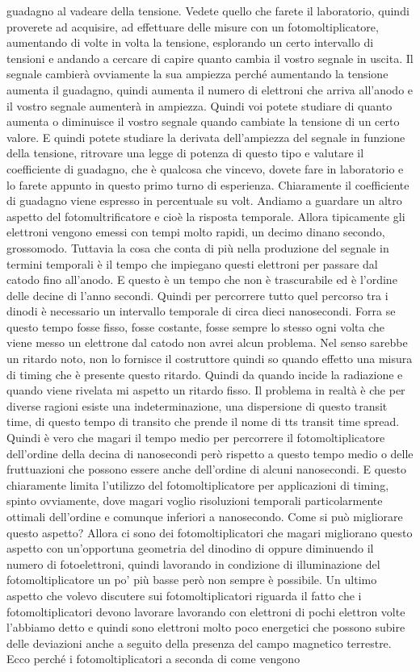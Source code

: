{guadagno al vadeare della tensione. Vedete quello che farete il laboratorio, quindi proverete ad acquisire, ad effettuare delle misure con un fotomoltiplicatore, aumentando di volte in volta la tensione, esplorando un certo intervallo di tensioni e andando a cercare di capire quanto cambia il vostro segnale in uscita. Il segnale cambierà ovviamente la sua ampiezza perché aumentando la tensione aumenta il guadagno, quindi aumenta il numero di elettroni che arriva all'anodo e il vostro segnale aumenterà in ampiezza. Quindi voi potete studiare di quanto aumenta o diminuisce il vostro segnale quando cambiate la tensione di un certo valore. E quindi potete studiare la derivata dell'ampiezza del segnale in funzione della tensione, ritrovare una legge di potenza di questo tipo e valutare il coefficiente di guadagno, che è qualcosa che vincevo, dovete fare in laboratorio e lo farete appunto in questo primo turno di esperienza. Chiaramente il coefficiente di guadagno viene espresso in percentuale su volt. Andiamo a guardare un altro aspetto del fotomultrificatore e cioè la risposta temporale. Allora tipicamente gli elettroni vengono emessi con tempi molto rapidi, un decimo dinano secondo, grossomodo. Tuttavia la cosa che conta di più nella produzione del segnale in termini temporali è il tempo che impiegano questi elettroni per passare dal catodo fino all'anodo. E questo è un tempo che non è trascurabile ed è l'ordine delle decine di l'anno secondi. Quindi per percorrere tutto quel percorso tra i dinodi è necessario un intervallo temporale di circa dieci nanosecondi. Forra se questo tempo fosse fisso, fosse costante, fosse sempre lo stesso ogni volta che viene messo un elettrone dal catodo non avrei alcun problema. Nel senso sarebbe un ritardo noto, non lo fornisce il costruttore quindi so quando effetto una misura di timing che è presente questo ritardo. Quindi da quando incide la radiazione e quando viene rivelata mi aspetto un ritardo fisso. Il problema in realtà è che per diverse ragioni esiste una indeterminazione, una dispersione di questo transit time, di questo tempo di transito che prende il nome di tts transit time spread. Quindi è vero che magari il tempo medio per percorrere il fotomoltiplicatore dell'ordine della decina di nanosecondi però rispetto a questo tempo medio o delle fruttuazioni che possono essere anche dell'ordine di alcuni nanosecondi. E questo chiaramente limita l'utilizzo del fotomoltiplicatore per applicazioni di timing, spinto ovviamente, dove magari voglio risoluzioni temporali particolarmente ottimali dell'ordine e comunque inferiori a nanosecondo. Come si può migliorare questo aspetto? Allora ci sono dei fotomoltiplicatori che magari migliorano questo aspetto con un'opportuna geometria del dinodino di oppure diminuendo il numero di fotoelettroni, quindi lavorando in condizione di illuminazione del fotomoltiplicatore un po' più basse però non sempre è possibile. Un ultimo aspetto che volevo discutere sui fotomoltiplicatori riguarda il fatto che i fotomoltiplicatori devono lavorare lavorando con elettroni di pochi elettron volte l'abbiamo detto e quindi sono elettroni molto poco energetici che possono subire delle deviazioni anche a seguito della presenza del campo magnetico terrestre. Ecco perché i fotomoltiplicatori a seconda di come vengono }
